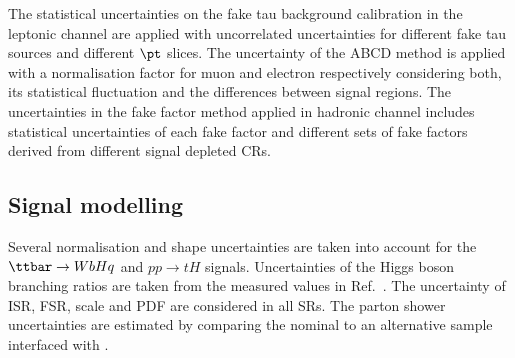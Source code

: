 The statistical uncertainties on the fake tau background calibration in the leptonic channel are applied with uncorrelated uncertainties for different fake tau sources and
different $\pt$ slices. The uncertainty of the ABCD method is applied with a normalisation factor for muon and electron respectively considering both,
its statistical fluctuation and the differences between signal regions.
The uncertainties in the fake factor method applied in hadronic channel includes statistical uncertainties of each fake factor and different sets of fake factors derived from different signal depleted CRs.

\subsection{Signal modelling}
\label{sec:syst_sigmodeling}

Several normalisation and shape uncertainties are taken into account for the $\Hq$ and $pp\to tH$ signals.
Uncertainties of the Higgs boson branching ratios are taken from the measured values in Ref.~\cite{Zyla:2020zbs}.
The uncertainty of ISR, FSR, scale and PDF are considered in all SRs. The parton shower uncertainties are estimated by comparing
the nominal to an alternative sample interfaced with {}.


